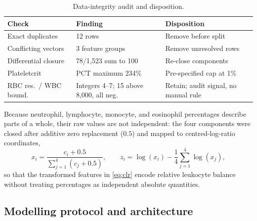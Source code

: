 \documentclass[conference]{IEEEtran}
\begin{document}
\begin{table}[!htbp]
\caption{Data-integrity audit and disposition.}
\label{tab:audit}\centering\footnotesize
\setlength{\tabcolsep}{3pt}
\begin{tabular}{|p{}|p{}|p{}|}\hline
\textbf{Check}&\textbf{Finding}&\textbf{Disposition}\\\hline
Exact duplicates&12 rows&Remove before split\\\hline
Conflicting vectors&3 feature groups&Remove unresolved rows\\\hline
Differential closure&78/1{,}523 sum to 100&Re-close components\\\hline
Plateletcrit&PCT maximum 234\%&Pre-specified cap at 1\%\\\hline
RBC res.\ / WBC bound.&Integers 4--7; 15 above 8{,}000, all neg.&Retain; audit signal, no manual rule\\\hline
\end{tabular}
\end{table}

Because neutrophil, lymphocyte, monocyte, and eosinophil percentages describe
parts of a whole, their raw values are not independent: the four components
were closed after additive zero replacement ($0.5$) and mapped to
centred-log-ratio coordinates,
\begin{equation}
x_i=\frac{c_i+0.5}{\sum_{j=1}^{4}(c_j+0.5)},\qquad
z_i=\log(x_i)-\frac{1}{4}\sum_{j=1}^{4}\log(x_j),
\label{eq:clr}
\end{equation}
so that the transformed features in \eqref{eq:clr} encode relative leukocyte
balance without treating percentages as independent absolute quantities.

\subsection{Modelling protocol and architecture}
\end{document}
